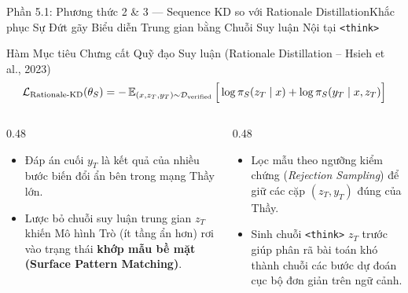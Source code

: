 \begin{frame}{Phần 5.1: Phương thức 2 \& 3 --- Sequence KD so với Rationale Distillation}{Khắc phục Sự Đứt gãy Biểu diễn Trung gian bằng Chuỗi Suy luận Nội tại \texttt{<think>}}
  \begin{block}{Hàm Mục tiêu Chưng cất Quỹ đạo Suy luận (Rationale Distillation -- Hsieh et al., 2023)}
    \[
      \mathcal{L}_{\text{Rationale-KD}}(\theta_S) = -\operatorname{\mathbb{E}}_{(x, z_T, y_T) \sim \mathcal{D}_{\text{verified}}} \Big[ \log \pi_S(z_T \mid x) + \log \pi_S(y_T \mid x, z_T) \Big]
    \]
  \end{block}

  \begin{columns}[T,onlytextwidth]
    \begin{column}{0.48\textwidth}
      \footnotesize
      \begin{itemize}\setlength{\itemsep}{5pt}
        \item Đáp án cuối $y_T$ là kết quả của nhiều bước biến đổi ẩn bên trong mạng Thầy lớn.
        \item Lược bỏ chuỗi suy luận trung gian $z_T$ khiến Mô hình Trò (ít tầng ẩn hơn) rơi vào trạng thái \textbf{khớp mẫu bề mặt (Surface Pattern Matching)}.
      \end{itemize}
    \end{column}
    \begin{column}{0.48\textwidth}
      \footnotesize
      \begin{itemize}\setlength{\itemsep}{5pt}
        \item Lọc mẫu theo ngưỡng kiểm chứng (\textit{Rejection Sampling}) để giữ các cặp $(z_T, y_T)$ đúng của Thầy.
        \item Sinh chuỗi \texttt{<think>} $z_T$ trước giúp phân rã bài toán khó thành chuỗi các bước dự đoán cục bộ đơn giản trên ngữ cảnh.
      \end{itemize}
    \end{column}
  \end{columns}
\end{frame}

